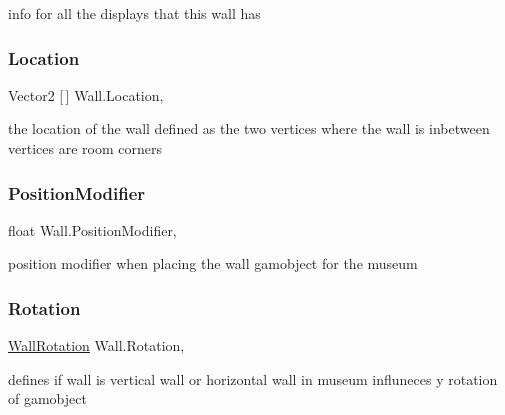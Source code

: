 info for all the displays that this wall has 

\mbox{\label{class_wall_ac7769d0a497da7e7ae3a11c813645b7a}} 
\subsubsection{\texorpdfstring{Location}{Location}}
{\footnotesize\ttfamily Vector2 \mbox{[}$\,$\mbox{]} Wall.\+Location\hspace{0.3cm}{\ttfamily [get]}, {}}



the location of the wall defined as the two vertices where the wall is inbetween vertices are room corners 

\mbox{\label{class_wall_ae056b7b9068536491c1ac441a25824a0}} 
\subsubsection{\texorpdfstring{Position\+Modifier}{PositionModifier}}
{\footnotesize\ttfamily float Wall.\+Position\+Modifier\hspace{0.3cm}{\ttfamily [get]}, {}}



position modifier when placing the wall gamobject for the museum 

\mbox{\label{class_wall_aa2d6c86c7ccabbb5e317b9ccac62e99e}} 
\subsubsection{\texorpdfstring{Rotation}{Rotation}}
{\footnotesize\ttfamily \mbox{\hyperlink{class_wall_a0ff16a0e73bfc8f0d89c5fd6849e3a97}{Wall\+Rotation}} Wall.\+Rotation\hspace{0.3cm}{\ttfamily [get]}, {}}



defines if wall is vertical wall or horizontal wall in museum influneces y rotation of gamobject 

\mbox{\label{class_wall_a1e5fab93aa7e8676dd65a61a26b28513}} 
